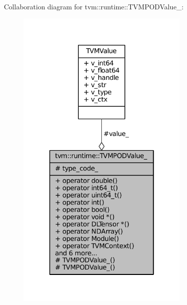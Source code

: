 Collaboration diagram for tvm\+:\+:runtime\+:\+:T\+V\+M\+P\+O\+D\+Value\+\_\+\+:
\nopagebreak
\begin{figure}[H]
\begin{center}
\leavevmode
\includegraphics[width=238pt]{classtvm_1_1runtime_1_1TVMPODValue____coll__graph}
\end{center}
\end{figure}
